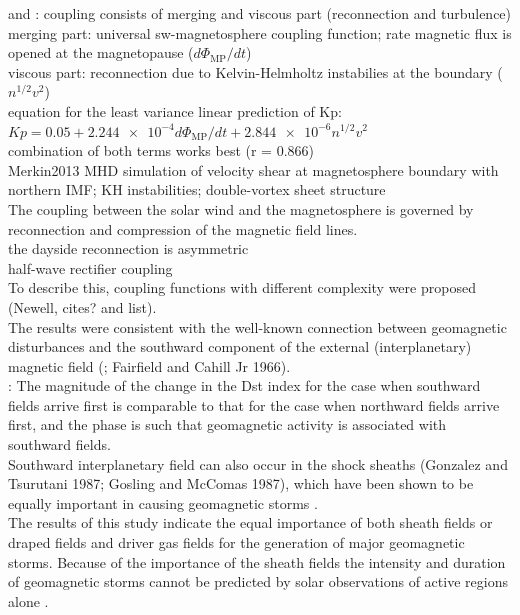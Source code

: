 \citet{Newell2007} and \citet{Newell2008}: coupling consists of merging and viscous part (reconnection and turbulence)\\
merging part: universal sw-magnetosphere coupling function; rate magnetic flux is opened at the magnetopause ($d\Phi_\text{MP}/dt$)\\
viscous part: reconnection due to Kelvin-Helmholtz instabilies at the boundary ($n^{1/2} v^2$)\\
equation for the least variance linear prediction of Kp: $Kp = 0.05 + \num{2.244e-4} d\Phi_\text{MP}/dt + \num{2.844e-6} n^{1/2} v^2$\\
combination of both terms works best (r = 0.866)\\

Merkin2013 MHD simulation of velocity shear at magnetosphere boundary with northern IMF; KH instabilities; double-vortex sheet structure\\



The coupling between the solar wind and the magnetosphere is governed by reconnection and compression of the magnetic field lines.\\

the dayside reconnection is asymmetric\\
half-wave rectifier coupling\\
To describe this, coupling functions with different complexity were proposed (Newell, cites? and list).\\


The results were consistent with the well-known connection between geomagnetic disturbances and the southward component of the external (interplanetary) magnetic field (\citep{Dungey1961}; Fairfield and Cahill Jr 1966).\\
\citep{Zhang1988}: The magnitude of the change in the Dst index for the case when southward fields arrive first is comparable to that for the case when northward fields arrive first, and the phase is such that geomagnetic activity is associated with southward fields.\\


Southward interplanetary field can also occur in the shock sheaths (Gonzalez and Tsurutani 1987; Gosling and McComas 1987), which have been shown to be equally important in causing geomagnetic storms \citep{Tsurutani1988}.\\
The results of this study indicate the equal importance of both sheath fields or draped fields and driver gas fields for the generation of major geomagnetic storms. Because of the importance of the sheath fields the intensity and duration of geomagnetic storms cannot be predicted by solar observations of active regions alone \citep{Tsurutani1988}.\\

